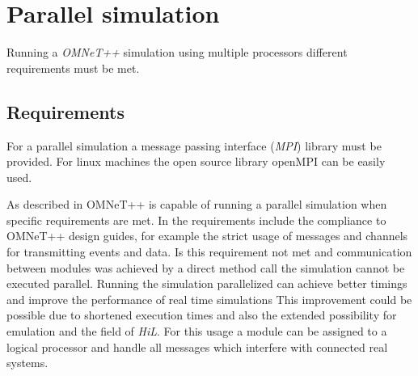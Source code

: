 \chapter{Parallel simulation}
\label{cha:parallel_sim}

Running a \emph{OMNeT++} simulation using multiple processors different requirements must be met.

\section{Requirements}
\label{sec:parallel_sim_requriements}

For a parallel simulation a message passing interface (\emph{MPI}) library must be provided.
For linux machines the open source library openMPI can be easily used.


As described in \cite{varga_parallel_2003} OMNeT++ is capable of running a parallel simulation when specific requirements are met.
In \cite{varga_parallel_2003} the requirements include the compliance to OMNeT++ design guides, for example the strict usage of messages and channels for transmitting events and data.
Is this requirement not met and communication between modules was achieved by a direct method call the simulation cannot be executed parallel.
Running the simulation parallelized can achieve better timings and improve the performance of real time simulations
This improvement could be possible due to shortened execution times and also the extended possibility for emulation and the field of \emph{HiL}.
For this usage a module can be assigned to a logical processor and handle all messages which interfere with connected real systems.